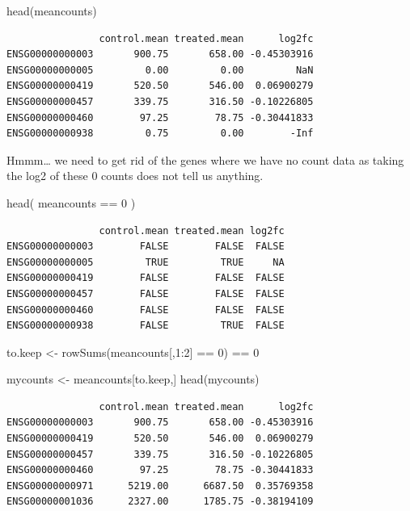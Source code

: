 \documentclass[
  letterpaper,
  DIV=11,
  numbers=noendperiod]{scrartcl}
\newenvironment{Shaded}{\begin{snugshade}}{\end{snugshade}}
\newcommand{\DecValTok}[1]{\textcolor[rgb]{0.68,0.00,0.00}{#1}}
\newcommand{\FunctionTok}[1]{\textcolor[rgb]{0.28,0.35,0.67}{#1}}
\newcommand{\NormalTok}[1]{\textcolor[rgb]{0.00,0.23,0.31}{#1}}
\newcommand{\OtherTok}[1]{\textcolor[rgb]{0.00,0.23,0.31}{#1}}
\newcommand{\SpecialCharTok}[1]{\textcolor[rgb]{0.37,0.37,0.37}{#1}}
\begin{document}
\begin{Shaded}
\begin{Highlighting}[]
\FunctionTok{head}\NormalTok{(meancounts)}
\end{Highlighting}
\end{Shaded}

\begin{verbatim}
                control.mean treated.mean      log2fc
ENSG00000000003       900.75       658.00 -0.45303916
ENSG00000000005         0.00         0.00         NaN
ENSG00000000419       520.50       546.00  0.06900279
ENSG00000000457       339.75       316.50 -0.10226805
ENSG00000000460        97.25        78.75 -0.30441833
ENSG00000000938         0.75         0.00        -Inf
\end{verbatim}

Hmmm\ldots{} we need to get rid of the genes where we have no count data
as taking the log2 of these 0 counts does not tell us anything.

\begin{Shaded}
\begin{Highlighting}[]
\FunctionTok{head}\NormalTok{( meancounts }\SpecialCharTok{==} \DecValTok{0}\NormalTok{ )}
\end{Highlighting}
\end{Shaded}

\begin{verbatim}
                control.mean treated.mean log2fc
ENSG00000000003        FALSE        FALSE  FALSE
ENSG00000000005         TRUE         TRUE     NA
ENSG00000000419        FALSE        FALSE  FALSE
ENSG00000000457        FALSE        FALSE  FALSE
ENSG00000000460        FALSE        FALSE  FALSE
ENSG00000000938        FALSE         TRUE  FALSE
\end{verbatim}

\begin{Shaded}
\begin{Highlighting}[]
\NormalTok{to.keep }\OtherTok{\textless{}{-}} \FunctionTok{rowSums}\NormalTok{(meancounts[,}\DecValTok{1}\SpecialCharTok{:}\DecValTok{2}\NormalTok{] }\SpecialCharTok{==} \DecValTok{0}\NormalTok{) }\SpecialCharTok{==} \DecValTok{0}

\NormalTok{mycounts }\OtherTok{\textless{}{-}}\NormalTok{ meancounts[to.keep,]}
\FunctionTok{head}\NormalTok{(mycounts)}
\end{Highlighting}
\end{Shaded}

\begin{verbatim}
                control.mean treated.mean      log2fc
ENSG00000000003       900.75       658.00 -0.45303916
ENSG00000000419       520.50       546.00  0.06900279
ENSG00000000457       339.75       316.50 -0.10226805
ENSG00000000460        97.25        78.75 -0.30441833
ENSG00000000971      5219.00      6687.50  0.35769358
ENSG00000001036      2327.00      1785.75 -0.38194109
\end{verbatim}
\end{document}
